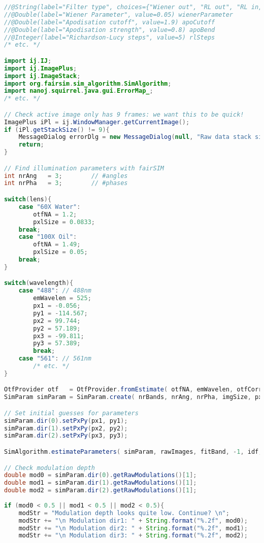 \clearpage
\begin{lstlisting}[language=java,caption={Extracts from the Beanshell script used for the LAG SIM parameter tester},label={snip:lagsim-fiji},frame=single]
//@String(label="Filter type", choices={"Wiener out", "RL out", "RL in, Wiener out", "RL in, RL out"}) filter
//@Double(label="Wiener Parameter", value=0.05) wienerParameter
//@Double(label="Apodisation cutoff", value=1.9) apoCutoff
//@Double(label="Apodisation strength", value=0.8) apoBend
//@Integer(label="Richardson-Lucy steps", value=5) rlSteps
/* etc. */

import ij.IJ;
import ij.ImagePlus;
import ij.ImageStack;
import org.fairsim.sim_algorithm.SimAlgorithm;
import nanoj.squirrel.java.gui.ErrorMap_;
/* etc. */

// Check active image only has 9 frames: we want this to be quick! 
ImagePlus iPl = ij.WindowManager.getCurrentImage();
if (iPl.getStackSize() != 9){
	MessageDialog errorDlg = new MessageDialog(null, "Raw data stack size error!", "Please use a single-slice, single-channel image for parameter finding.");
	return;
}

// Find illumination parameters with fairSIM
int nrAng   = 3;		// #angles
int nrPha   = 3;		// #phases

switch(lens){
	case "60X Water":
		otfNA = 1.2;
		pxlSize = 0.0833;
	break;
	case "100X Oil":
		oftNA = 1.49;
		pxlSize = 0.05;
	break;
}

switch(wavelength){
	case "488": // 488nm
		emWavelen = 525; 
		px1 = -0.056;
		py1 = -114.567;
		px2 = 99.744;
		py2 = 57.189;
		px3 = -99.811;
		py3 = 57.389;
		break;
	case "561": // 561nm
		/* etc. */
}

OtfProvider otf   = OtfProvider.fromEstimate( otfNA, emWavelen, otfCorr );
SimParam simParam = SimParam.create( nrBands, nrAng, nrPha, imgSize, pxlSize, otf );

// Set initial guesses for parameters
simParam.dir(0).setPxPy(px1, py1);
simParam.dir(1).setPxPy(px2, py2);
simParam.dir(2).setPxPy(px3, py3);

SimAlgorithm.estimateParameters( simParam, rawImages, fitBand, -1, idf, visualFeedback, null);

// Check modulation depth 
double mod0 = simParam.dir(0).getRawModulations()[1];
double mod1 = simParam.dir(1).getRawModulations()[1];
double mod2 = simParam.dir(2).getRawModulations()[1];
					
if (mod0 < 0.5 || mod1 < 0.5 || mod2 < 0.5){
	modStr = "Modulation depth looks quite low. Continue? \n";
	modStr += "\n Modulation dir1: " + String.format("%.2f", mod0);
	modStr += "\n Modulation dir2: " + String.format("%.2f", mod1);
	modStr += "\n Modulation dir3: " + String.format("%.2f", mod2);
						

\end{lstlisting}
